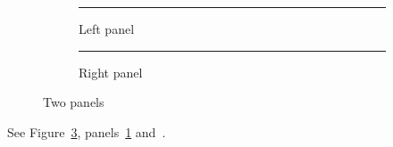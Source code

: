 \documentclass{article}
\begin{document}
\begin{figure}
\centering
\begin{subfigure}[b]{0.45\textwidth}
  \centering
  \rule{2cm}{1cm}
  \caption{Left panel}\label{fig:a}
\end{subfigure}
\hfill
\begin{subfigure}[b]{0.45\textwidth}
  \centering
  \rule{2cm}{1cm}
  \caption{Right panel}\label{fig:b}
\end{subfigure}
\caption{Two panels}\label{fig:both}
\end{figure}
See Figure~\ref{fig:both}, panels~\ref{fig:a} and~.
\end{document}
